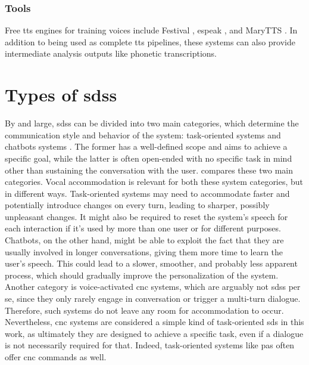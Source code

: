 \subsubsection{Tools}
\label{subsubsec:tools_tts}

Free \ac{tts} engines for training voices include Festival \citep{Black1997festival}, espeak \citep{Duddington2012espeak}, and MaryTTS \citep{Schroder2011open}.
In addition to being used as complete \ac{tts} pipelines, these systems can also provide intermediate analysis outputs like phonetic transcriptions.

\section{Types of \aclp{sds}}
\label{sec:types_of_sdss}

By and large, \acp{sds} can be divided into two main categories, which determine the communication style and behavior of the system: task-oriented systems \citep[e.g.,][]{Wen2016network, Zhao2016towards} and chatbots systems \citep[e.g.,][]{Vinyals2015neural, Li2016deep}.
The former has a well-defined scope and aims to achieve a specific goal, while the latter is often open-ended with no specific task in mind other than sustaining the conversation with the user.
 compares these two main categories.
Vocal accommodation is relevant for both these system categories, but in different ways.
Task-oriented systems may need to accommodate faster and potentially introduce changes on every turn, leading to sharper, possibly unpleasant changes.
It might also be required to reset the system's speech for each interaction if it's used by more than one user or for different purposes.
Chatbots, on the other hand, might be able to exploit the fact that they are usually involved in longer conversations, giving them more time to learn the user's speech.
This could lead to a slower, smoother, and probably less apparent process, which should gradually improve the personalization of the system.
Another category is voice-activated \ac{cnc} systems, which are arguably not \acp{sds} per se, since they only rarely engage in conversation or trigger a multi-turn dialogue.
Therefore, such systems do not leave any room for accommodation to occur.
Nevertheless, \ac{cnc} systems are considered a simple kind of task-oriented \ac{sds} in this work, as ultimately they are designed to achieve a specific task, even if a dialogue is not necessarily required for that.
Indeed, task-oriented systems like \acp{pa} often offer \ac{cnc} commands as well.
